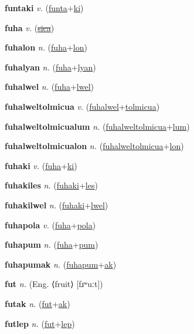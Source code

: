 \textbf{\hypertarget{funtaki}{funtaki}} \textit{v.} (\hyperlink{funta}{funta}+\allowbreak \hyperlink{ki}{ki})


\textbf{\hypertarget{fuha}{fuha}} \textit{v.} (\hyperlink{sica}{\sout{sica}})


\textbf{\hypertarget{fuhalon}{fuhalon}} \textit{n.} (\hyperlink{fuha}{fuha}+\allowbreak \hyperlink{lon}{lon})


\textbf{\hypertarget{fuhalyan}{fuhalyan}} \textit{n.} (\hyperlink{fuha}{fuha}+\allowbreak \hyperlink{lyan}{lyan})


\textbf{\hypertarget{fuhalwel}{fuhalwel}} \textit{n.} (\hyperlink{fuha}{fuha}+\allowbreak \hyperlink{lwel}{lwel})


\textbf{\hypertarget{fuhalweltolmicua}{fuhalweltolmicua}} \textit{v.} (\hyperlink{fuhalwel}{fuhalwel}+\allowbreak \hyperlink{tolmicua}{tolmicua})


\textbf{\hypertarget{fuhalweltolmicualum}{fuhalweltolmicualum}} \textit{n.} (\hyperlink{fuhalweltolmicua}{fuhalweltolmicua}+\allowbreak \hyperlink{lum}{lum})


\textbf{\hypertarget{fuhalweltolmicualon}{fuhalweltolmicualon}} \textit{n.} (\hyperlink{fuhalweltolmicua}{fuhalweltolmicua}+\allowbreak \hyperlink{lon}{lon})


\textbf{\hypertarget{fuhaki}{fuhaki}} \textit{v.} (\hyperlink{fuha}{fuha}+\allowbreak \hyperlink{ki}{ki})


\textbf{\hypertarget{fuhakiles}{fuhakiles}} \textit{n.} (\hyperlink{fuhaki}{fuhaki}+\allowbreak \hyperlink{les}{les})


\textbf{\hypertarget{fuhakilwel}{fuhakilwel}} \textit{n.} (\hyperlink{fuhaki}{fuhaki}+\allowbreak \hyperlink{lwel}{lwel})


\textbf{\hypertarget{fuhapola}{fuhapola}} \textit{v.} (\hyperlink{fuha}{fuha}+\allowbreak \hyperlink{pola}{pola})


\textbf{\hypertarget{fuhapum}{fuhapum}} \textit{n.} (\hyperlink{fuha}{fuha}+\allowbreak \hyperlink{pum}{pum})


\textbf{\hypertarget{fuhapumak}{fuhapumak}} \textit{n.} (\hyperlink{fuhapum}{fuhapum}+\allowbreak \hyperlink{ak}{ak})


\textbf{\hypertarget{fut}{fut}} \textit{n.} (Eng. ⟨fruit⟩ [fɹʷuːt])


\textbf{\hypertarget{futak}{futak}} \textit{n.} (\hyperlink{fut}{fut}+\allowbreak \hyperlink{ak}{ak})


\textbf{\hypertarget{futlep}{futlep}} \textit{n.} (\hyperlink{fut}{fut}+\allowbreak \hyperlink{lep}{lep})


